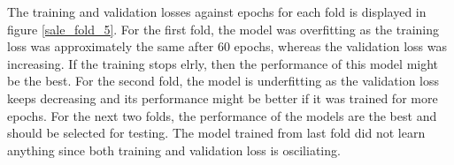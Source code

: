 \documentclass[12pt,twoside]{report}
\begin{document}
The training and validation losses against epochs for each fold is displayed in figure \ref{sale_fold_5}. For the first fold, the model was overfitting as the training loss was approximately the same after 60 epochs, whereas the validation loss was increasing. If the training stops elrly, then the performance of this model might be the best. For the second fold, the model is underfitting as the validation loss keeps decreasing and its performance might be better if it was trained for more epochs. For the next two folds, the performance of the models are the best and should be selected for testing. The model trained from last fold did not learn anything since both training and validation loss is osciliating. 
\\

\begin{figure}[h]
	\centering
	\hfill
	\hfill
	\hfil

\end{figure}
\end{document}
